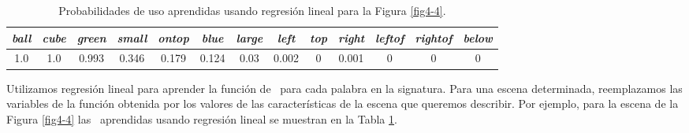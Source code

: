 

\begin{table}[h!]
\begin{center}
\begin{tabular}{ccccccccccccc}
\hline
\it{ball} & \it{cube} &  \it{green} & \it{small} &  \it{ontop} &  \it{blue} &  \it{large} &  \it{left} &  \it{top} &\it{right} &  \it{leftof} &    \it{rightof} &\it{below} \\
\hline

1.0 & 1.0 & 0.993 &0.346 &0.179 & 0.124 &0.03  &0.002  &0 & 0.001 &0&0&0\\
\hline
\end{tabular}
\caption{Probabilidades de uso aprendidas usando regresi\'on lineal para la Figura \ref{fig4-4}.} 
\label{probability-of-use2}
\end{center}
\end{table}


Utilizamos regresi\'on lineal para aprender la funci\'on de
\puse\ para cada palabra en la signatura. Para una escena determinada, reemplazamos
las variables de la funci\'on obtenida por los valores de las caracter\'{i}sticas
de la escena que queremos describir. Por ejemplo, para la escena de la Figura \ref{fig4-4} las \puse\ aprendidas usando regresi\'on lineal se muestran en la Tabla \ref{probability-of-use2}. 

